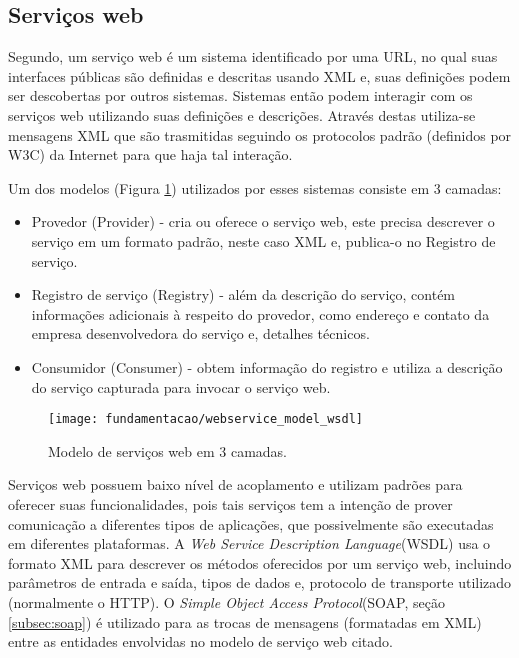 \subsection{Serviços web}
Segundo\cite{Dustdar:2005}, um serviço web é um sistema identificado por uma URL\footnotemark {}, no qual suas interfaces públicas são definidas e descritas usando XML\footnotemark {} e, suas definições podem ser descobertas por outros sistemas. Sistemas então podem interagir com os serviços web utilizando suas definições e descrições. Através destas utiliza-se mensagens XML que são trasmitidas seguindo os protocolos padrão (definidos por W3C\footnotemark {}) da Internet para que haja tal interação.

Um dos modelos (Figura \ref{fig:wsmodelwsdl}) utilizados por esses sistemas consiste em 3 camadas:
\begin{itemize}
\item Provedor (Provider) - cria ou oferece o serviço web, este precisa descrever o serviço em um formato padrão, neste caso XML e, publica-o no Registro de serviço.
\item Registro de serviço (Registry) - além da descrição do serviço, contém informações adicionais à respeito do provedor, como endereço e contato da empresa desenvolvedora do serviço e, detalhes técnicos. 
\item Consumidor (Consumer) - obtem informação do registro e utiliza a descrição do serviço capturada para invocar o serviço web.
\end{itemize}

\begin{figure}[!htb] \centering 
  \centering
  \texttt{[image: fundamentacao/webservice\_model\_wsdl]} 
  \caption{Modelo de serviços web em 3 camadas.\cite{Dustdar:2005}} 
  \label{fig:wsmodelwsdl}
\end{figure}

Serviços web possuem baixo nível de acoplamento e utilizam padrões para oferecer suas funcionalidades, pois tais serviços tem a intenção de prover comunicação a diferentes tipos de aplicações, que possivelmente são executadas em diferentes plataformas. A \textit{Web Service Description Language}(WSDL) usa o formato XML para descrever os métodos oferecidos por um serviço web, incluindo parâmetros de entrada e saída, tipos de dados e, protocolo de transporte utilizado (normalmente o HTTP). O \textit{Simple Object Access Protocol}(SOAP, seção \ref{subsec:soap}) é utilizado para as trocas de mensagens (formatadas em XML) entre as entidades envolvidas no modelo de serviço web citado.\cite{Dustdar:2005}

